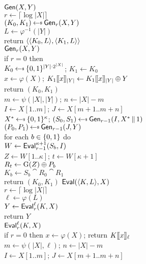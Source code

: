 \begin{figure}
  {
    \underline{$\gen(X,Y)$}\\[2pt]
      $r \gets \lceil \log |X| \rceil$\\
      $(K_0, K_1) \getsr \gen_r(X,Y)$\\
      $L \gets \varphi^{-1}(|Y|)$\\
      return $\str{\str{K_0, L}, \str{K_1, L}}$
    \\[6pt]
    \underline{$\gen_{r}(X, Y)$}\\[2pt]
      if $r=0$ then\\
      \ind $K_0 \getsr \bits^{|Y|\cdot2^{|X|}}$; $K_1 \gets K_0$\\
      \ind $x \gets \varphi(X)$; $\block{|Y|}{K_1}{x} \gets \block{|Y|}{K_1}{x} \xor Y$\\
      \ind return $(K_0, K_1)$\\
      $m \gets \psi(|X|, |Y|)$; $n \gets |X| - m$\\
      $I \gets X[1..m]$; $J \gets X[m+1..m+n]$\\
      $X^* \getsr \bits^\kappa$;
      $(S_0, S_1) \getsr \gen_{r-1}(I, X^*\cat 1)$\\
      $(P_0, P_1) \getsr \gen_{r-1}(J, Y)$\\
      for each $b\in \bits$ do\\
      \ind $W \gets \eval_{r-1}^{\kappa+1}(S_b, I)$\\
      \ind $Z \gets W[1..\kappa]$; $t \gets W[\kappa+1]$\\
      \ind $R_t \gets \prg(Z) \xor P_b$\\
      \ind $K_b \gets S_b \cat R_0 \cat R_1$\\
      return $(K_0, K_1)$
  }
  {
    \underline{$\eval(\str{K,L}, X)$}\\[2pt]
      $r \gets \lceil \log |X| \rceil$\\
      $\ell \gets \varphi(L)$\\
      $Y \gets \eval^\ell_r(K, X)$\\
      return $Y$
    \\[6pt]
    \underline{$\eval_{r}^\ell(K, X)$}\\[2pt]
      if $r=0$ then $x \gets \varphi(X)$; return $\block{\ell}{K}{x}$\\
      $m \gets \psi(|X|, \ell)$; $n \gets |X| - m$\\
      $I \gets X[1..m]$; $J \gets X[m+1..m+n]$\\
      \\
}
\end{figure}
